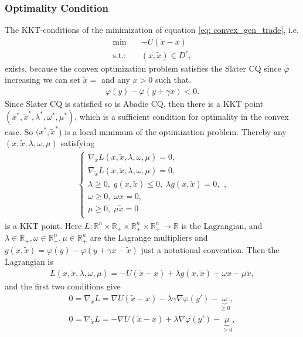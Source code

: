 \subsubsection{Optimality Condition\label{sec: optimality condition}}
The KKT-conditions of the minimization of
equation \ref{eq: convex_gen_trade}, i.e.
\begin{align}
    \text{min} \quad &-U(\tilde{x}-x)\\
    \text{s.t.:}\quad & (x,\tilde{x}) \in D^{r},
\end{align}
exists, because the convex optimization problem satisfies the Slater CQ since
$\varphi$ increasing we can set $\tilde{x}=$ and any $x>0$ such that. \begin{align}
    \varphi(y) - \varphi(y + \gamma x) < 0.
\end{align}
Since Slater CQ is satisfied so is Abadie CQ, then there is a KKT point
$(x^{*} , \tilde{x}^{*}, \lambda^{*} , \omega^{*} , \mu^{*} )$, which is a
sufficient condition for optimality in the convex case. So $(x^{*} ,
\tilde{x}^{*}$) is a local minimum of the optimization problem.
Thereby any $(x, \tilde{x}, \lambda, \omega, \mu)$ satisfying
\begin{align}
    \begin{cases}
    \nabla_x L(x, \tilde{x}, \lambda, \omega, \mu) = 0,\\
    \nabla_{\tilde{x}} L(x, \tilde{x}, \lambda, \omega, \mu) = 0,\\
    \lambda \ge 0,\; g(x, \tilde{x}) \le 0,\; \lambda g(x, \tilde{x}) = 0,\\
    \omega \ge 0,\; \omega x = 0,\\
    \mu \ge 0,\; \mu \tilde{x} = 0\\
    \end{cases},
\end{align}
is a KKT point.
Here $L:
\mathbb{R}^{n}\times\mathbb{R}_+\times\mathbb{R}_+^{n}\times\mathbb{R}_+^{n}
\to \mathbb{R} $ is the Lagrangian, and $\lambda \in \mathbb{R}_+, \omega \in
\mathbb{R}_+^{n}, \mu \in \mathbb{R}_+^{n}$  are the Lagrange multipliers and
$g(x, \tilde{x}) = \varphi(y) - \varphi(y + \gamma x - \tilde{x})$ just a
notational convention. Then the Lagrangian is
\begin{align}
    L(x, \tilde{x},\lambda, \omega, \mu) = -U(\tilde{x}-x) + \lambda g(x,
    \tilde{x}) - \omega x - \mu \tilde{x},
\end{align}
and the first two conditions give
\begin{align}
    0 = \nabla_x L = \nabla U(\tilde{x}-x) - \lambda \gamma \nabla\varphi(y') -
    \underbrace{\omega}_{\ge0},\\
    0 = \nabla_{\tilde{x}} L = - \nabla U(\tilde{x}-x) + \lambda  \nabla\varphi(y') -
    \underbrace{\mu}_{\ge0},
\end{align}
